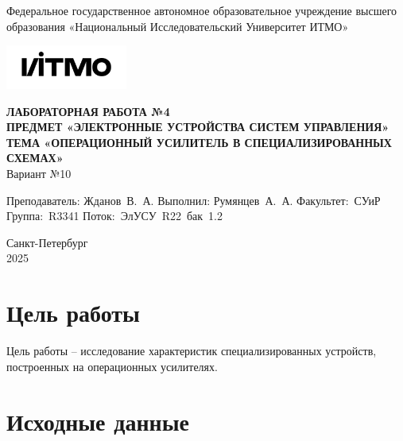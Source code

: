 \documentclass[a4paper, 12pt]{article}
\begin{document}
    \begin{titlepage}

        \begin{center}
        Федеральное государственное автономное образовательное учреждение высшего образования
        «Национальный Исследовательский Университет ИТМО»
        \vfill
        
        \includegraphics[width=0.3\textwidth]{itmo.png} %

        {\large\bf ЛАБОРАТОРНАЯ РАБОТА №4}\\
        {\large\bf ПРЕДМЕТ «ЭЛЕКТРОННЫЕ УСТРОЙСТВА СИСТЕМ УПРАВЛЕНИЯ»}\\
        {\large\bf ТЕМА «ОПЕРАЦИОННЫЙ УСИЛИТЕЛЬ В СПЕЦИАЛИЗИРОВАННЫХ СХЕМАХ»}\\
        Вариант №10
        \vfill

        \begin{flushright}
            \begin{minipage}{.45\textwidth}
            {
                \hbox{Преподаватель:}
                \hbox{Жданов В. А.}
                \hbox{}
                \hbox{Выполнил:}
                \hbox{Румянцев А. А.}
                \hbox{}
                \hbox{Факультет: СУиР}
                \hbox{Группа: R3341}
                \hbox{Поток: ЭлУСУ R22 бак 1.2}
            }
            \end{minipage}
        \end{flushright}
        \vfill
  
        Санкт-Петербург\\
        2025
        \end{center}
    \end{titlepage}
    
    \tableofcontents

    \newpage
    \section{Цель работы}
    Цель работы -- исследование характеристик специализированных устройств, построенных на операционных усилителях.


    \section{Исходные данные}
\end{document}
